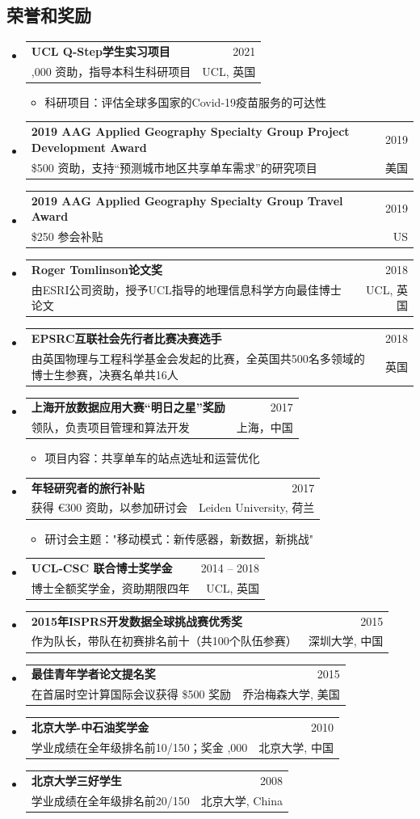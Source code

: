 \documentclass[A4,11pt]{article}
\makeatletter
\newcommand{\CVItem}[1]{
  \item\small{
    {#1 \vspace{-2pt}}
  }
}
\newcommand{\CVSubheading}[4]{
  \vspace{-2pt}\item
    \begin{tabular*}{0.97\textwidth}[t]{l@{\extracolsep{\fill}}r}
      \textbf{#1} & #2 \\
      \small#3 & \small #4 \\
    \end{tabular*}\vspace{-7pt}
}
\newcommand{\CVSubHeadingListStart}{\begin{itemize}[leftmargin=0.5cm, label={}]}
\newcommand{\CVSubHeadingListEnd}{\end{itemize}}
\newcommand{\CVItemListStart}{\begin{itemize}}
\newcommand{\CVItemListEnd}{\end{itemize}\vspace{-5pt}}
\makeatother
\begin{document}
\begin{CJK*}{UTF8}{gbsn}
\section{荣誉和奖励}
  \CVSubHeadingListStart
    \CVSubheading
      {UCL Q-Step学生实习项目}{2021}
      {\textsterling 3,000 资助，指导本科生科研项目}{UCL, 英国}
      \CVItemListStart
        \CVItem{科研项目：评估全球多国家的Covid-19疫苗服务的可达性}
      \CVItemListEnd
    \CVSubheading
      {2019 AAG Applied Geography Specialty Group Project Development Award}{2019}
      {\$500 资助，支持“预测城市地区共享单车需求”的研究项目}{美国}
    \CVSubheading
      {2019 AAG Applied Geography Specialty Group Travel Award}{2019}
      {\$250 参会补贴}{US}
    \CVSubheading
      {Roger Tomlinson论文奖}{2018}
      {由ESRI公司资助，授予UCL指导的地理信息科学方向最佳博士论文}{UCL, 英国}
    \CVSubheading
      {EPSRC互联社会先行者比赛决赛选手}{2018}
      {由英国物理与工程科学基金会发起的比赛，全英国共500名多领域的博士生参赛，决赛名单共16人}{英国}
    \CVSubheading
      {上海开放数据应用大赛“明日之星”奖励}{2017}
      {领队，负责项目管理和算法开发}{上海，中国}
      \CVItemListStart
        \CVItem{项目内容：共享单车的站点选址和运营优化}
      \CVItemListEnd
    \CVSubheading
      {年轻研究者的旅行补贴}{2017}
      {获得 €300 资助，以参加研讨会}{Leiden University, 荷兰}
      \CVItemListStart
        \CVItem{研讨会主题："移动模式：新传感器，新数据，新挑战"}
      \CVItemListEnd
    \CVSubheading
      {UCL-CSC 联合博士奖学金}{2014 -- 2018}
      {博士全额奖学金，资助期限四年}{UCL, 英国}
    \CVSubheading
      {2015年ISPRS开发数据全球挑战赛优秀奖}{2015}
      {作为队长，带队在初赛排名前十（共100个队伍参赛）}{深圳大学, 中国}
    \CVSubheading
      {最佳青年学者论文提名奖}{2015}
      {在首届时空计算国际会议获得 \$500 奖励}{乔治梅森大学, 美国}
    \CVSubheading
      {北京大学-中石油奖学金}{2010}
      {学业成绩在全年级排名前10/150；奖金 \textyen5,000}{北京大学, 中国}
    \CVSubheading
      {北京大学三好学生}{2008}
      {学业成绩在全年级排名前20/150}{北京大学, China}
      
  \CVSubHeadingListEnd

\end{CJK*}
\end{document}
